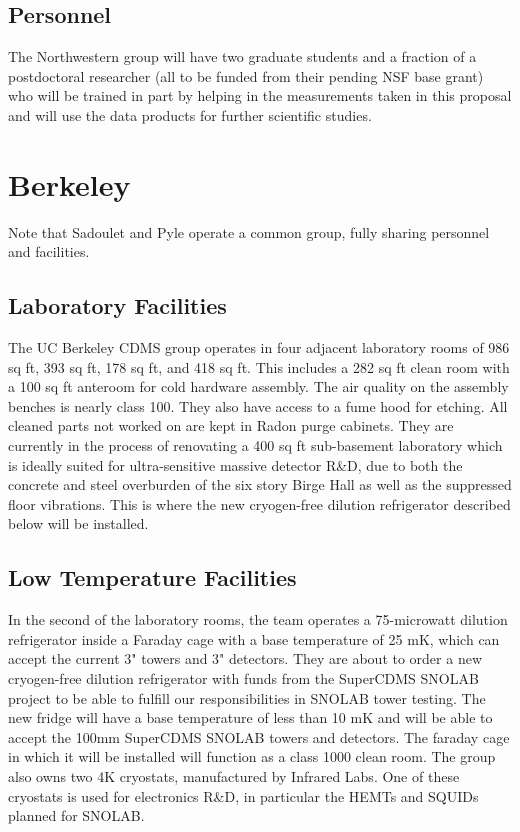 \subsection{Personnel}
The Northwestern group will have two graduate students and a fraction of a postdoctoral researcher (all to be funded from their pending NSF base grant) who will be trained in part by helping in the measurements taken in this proposal and will use the data products for further scientific studies.

\section{Berkeley}
Note that Sadoulet and Pyle operate a common group, fully sharing personnel and facilities.

\subsection{Laboratory Facilities}

The UC Berkeley CDMS group operates in four adjacent laboratory rooms of 986 sq ft, 393 sq ft, 178 sq ft, and 418 sq ft. This includes a 282 sq ft clean room with a 100 sq ft anteroom for cold hardware assembly. The air quality on the assembly benches is nearly class 100. They also have access to a fume hood for etching. All cleaned parts not worked on are kept in Radon purge cabinets. 
They are currently in the process of renovating a 400 sq ft sub-basement laboratory which is ideally suited for ultra-sensitive massive detector R\&D, due to both the concrete and steel overburden of the six story Birge Hall as well as the suppressed floor vibrations. This is where the new cryogen-free dilution refrigerator described below will be installed.

\subsection{Low Temperature Facilities}
In the second of the laboratory rooms, the team operates a 75-microwatt dilution refrigerator inside a Faraday cage with a base temperature of 25 mK, which can accept the current 3" towers and 3" detectors. 
They are about to order a new cryogen-free dilution refrigerator with funds from the SuperCDMS SNOLAB project to be able to fulfill our responsibilities in SNOLAB tower testing. The new fridge will have a base temperature  of less than 10 mK and will be able to accept the 100mm SuperCDMS SNOLAB towers and detectors. The faraday cage in which it will be installed will function as a class 1000 clean room. 
The group also owns two 4K cryostats, manufactured by Infrared Labs. One of these cryostats is used for electronics R\&D, in particular the HEMTs and SQUIDs planned for SNOLAB. 


